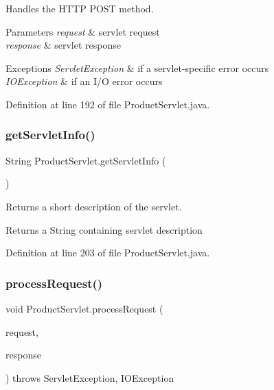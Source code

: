 Handles the H\+T\+TP {\ttfamily P\+O\+ST} method.


\begin{DoxyParams}{Parameters}
{\em request} & servlet request \\
\hline
{\em response} & servlet response \\
\hline
\end{DoxyParams}

\begin{DoxyExceptions}{Exceptions}
{\em Servlet\+Exception} & if a servlet-\/specific error occurs \\
\hline
{\em I\+O\+Exception} & if an I/O error occurs \\
\hline
\end{DoxyExceptions}


Definition at line 192 of file Product\+Servlet.\+java.

\mbox{\label{class_product_servlet_a1e34fde9a46b47c66c28f6e1b939757f}} 
\subsubsection{\texorpdfstring{getServletInfo()}{getServletInfo()}}
{\footnotesize\ttfamily String Product\+Servlet.\+get\+Servlet\+Info (\begin{DoxyParamCaption}{ }\end{DoxyParamCaption})}

Returns a short description of the servlet.

\begin{DoxyReturn}{Returns}
a String containing servlet description 
\end{DoxyReturn}


Definition at line 203 of file Product\+Servlet.\+java.

\mbox{\label{class_product_servlet_a748fbea7145fcb13f23bfb5a34bec99a}} 
\subsubsection{\texorpdfstring{processRequest()}{processRequest()}}
{\footnotesize\ttfamily void Product\+Servlet.\+process\+Request (\begin{DoxyParamCaption}\item[{Http\+Servlet\+Request}]{request,  }\item[{Http\+Servlet\+Response}]{response }\end{DoxyParamCaption}) throws Servlet\+Exception, I\+O\+Exception\hspace{0.3cm}{\ttfamily [protected]}}

